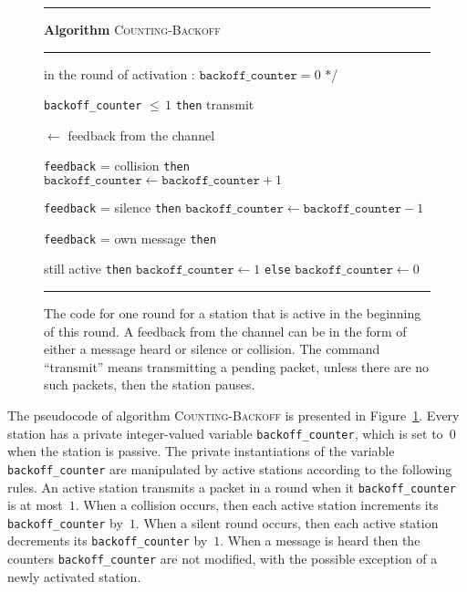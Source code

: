 \documentclass[11pt]{article}
\newcommand{\F}{\vspace*{\smallskipamount}}
\newcommand{\FFF}{\vspace*{\bigskipamount}}
\newcommand{\B}{\vspace*{-\smallskipamount}}
\newcommand{\Item}{\B\item}
\newlength{\pagewidth}
\newlength{\captionwidth}
\begin{document}
\begin{figure}[t]
\rule{\textwidth}{0.75pt}

\F 
\textbf{Algorithm} \textsc{Counting-Backoff} 

\rule{\textwidth}{0.75pt}
\begin{center}
\begin{minipage}{\pagewidth}
\begin{description}
\Item[\rm /$\ast$] in the round of activation : $\texttt{backoff\_counter} = 0$ $\ast$/ 

\Item[\tt if] \texttt{backoff\_counter} $\leq \, 1$  \texttt{then} transmit

\Item[\tt feedback] $\leftarrow$ feedback from the channel 

\Item[\tt if] \texttt{feedback} = collision  \texttt{then}
		$\texttt{backoff\_counter} \leftarrow \texttt{backoff\_counter} + 1$
		
\Item[\tt else if] \texttt{feedback} = silence  \texttt{then} $\texttt{backoff\_counter} \leftarrow 		\texttt{backoff\_counter} - 1$

\Item[\tt else if] \texttt{feedback} = own message \texttt{then}
\begin{description}

\Item[\tt if] still active  \texttt{then} $\texttt{backoff\_counter} \leftarrow 1$  \texttt{else} $\texttt{backoff\_counter} \leftarrow 0$

\end{description}
\end{description}
\end{minipage}
\FFF

\rule{\textwidth}{0.75pt}

\parbox{\captionwidth}{\caption{\label{alg:stack-backoff}
The code for one round for a station that is active in the beginning of this round. 
A feedback from the channel can be in the form of either a message heard or  silence or  collision.
The command ``transmit'' means transmitting a pending packet, unless there are no such packets, then the station pauses.
}}
\end{center}
\end{figure}

The pseudocode of algorithm \textsc{Counting-Backoff} is presented in Figure~\ref{alg:stack-backoff}. 
Every station has a private integer-valued variable \texttt{backoff\-\_counter}, which is set to~$0$  when the station is passive. 
The private instantiations of the variable \texttt{backoff\_counter} are manipulated by active stations according to the following rules.
An active station transmits a packet  in a round when it \texttt{\texttt{backoff\_counter}} is at most~$1$.
When a collision occurs, then each active station increments its \texttt{backoff\_counter} by~$1$.
When a silent round occurs, then each active station decrements its \texttt{backoff\_counter} by~$1$.
When a message is heard then the counters \texttt{backoff\_counter} are not modified, with the possible exception of a newly activated station.
\end{document}
